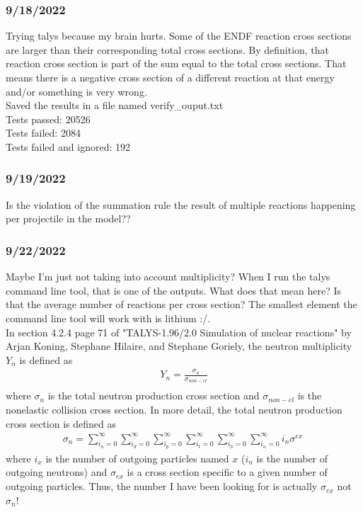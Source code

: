 \documentclass[12pt]{article}
\begin{document}
\subsubsection{9/18/2022}
Trying talys because my brain hurts. Some of the ENDF reaction cross sections are larger than their corresponding total cross sections. By definition, that reaction cross section is part of the sum equal to the total cross sections. That means there is a negative cross section of a different reaction at that energy and/or something is very wrong. \\
Saved the results in a file named verify\_ouput.txt\\
Tests passed: 20526\\Tests failed: 2084\\Tests failed and ignored: 192
\subsubsection{9/19/2022}
Is the violation of the summation rule the result of multiple reactions happening per projectile in the model??
\subsubsection{9/22/2022}
Maybe I'm just not taking into account multiplicity? When I run the talys command line tool, that is one of the outputs. What does that mean here? Is that the average number of reactions per cross section? The smallest element the command line tool will work with is lithium :/. \\
In section 4.2.4 page 71 of "TALYS-1.96/2.0
Simulation of nuclear reactions" by Arjan Koning, Stephane Hilaire, and Stephane Goriely, the neutron multiplicity $Y_n$ is defined as 
\begin{equation}
\begin{split}
Y_n = \frac{\sigma_n}{\sigma_{non-el}}\\
\end{split}
\end{equation}
where $\sigma_n$ is the total neutron production cross section and $\sigma_{non-el}$ is the nonelastic collision cross section. In more detail, the total neutron production cross section is defined as 
\begin{equation}
\begin{split}
\sigma_n = \sum_{i_n=0}^\infty\sum_{i_d=0}^\infty\sum_{i_p=0}^\infty\sum_{i_t=0}^\infty\sum_{i_h=0}^\infty\sum_{i_\alpha=0}^\infty i_n\sigma^{ex}\
\end{split}
\end{equation}
where $i_x$ is the number of outgoing particles named $x$ ($i_n$ is the number of outgoing neutrons) and $\sigma_{ex}$ is a cross section specific to a given number of outgoing particles. Thus, the number I have been looking for is actually $\sigma_{ex}$ not $\sigma_n$! 
\end{document}
